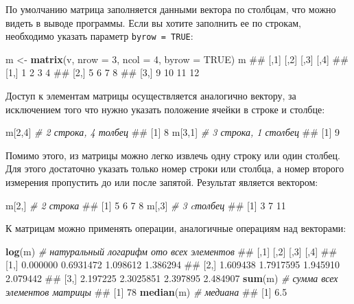 \documentclass[]{book}
\newenvironment{Shaded}{\begin{snugshade}}{\end{snugshade}}
\newcommand{\KeywordTok}[1]{\textcolor[rgb]{0.13,0.29,0.53}{\textbf{#1}}}
\newcommand{\DataTypeTok}[1]{\textcolor[rgb]{0.13,0.29,0.53}{#1}}
\newcommand{\DecValTok}[1]{\textcolor[rgb]{0.00,0.00,0.81}{#1}}
\newcommand{\StringTok}[1]{\textcolor[rgb]{0.31,0.60,0.02}{#1}}
\newcommand{\CommentTok}[1]{\textcolor[rgb]{0.56,0.35,0.01}{\textit{#1}}}
\newcommand{\OtherTok}[1]{\textcolor[rgb]{0.56,0.35,0.01}{#1}}
\newcommand{\NormalTok}[1]{#1}
\begin{document}
По умолчанию матрица заполняется данными вектора по столбцам, что можно
видеть в выводе программы. Если вы хотите заполнить ее по строкам,
необходимо указать параметр \texttt{byrow\ =\ TRUE}:

\begin{Shaded}
\begin{Highlighting}[]
\NormalTok{m <-}\StringTok{ }\KeywordTok{matrix}\NormalTok{(v, }\DataTypeTok{nrow =} \DecValTok{3}\NormalTok{, }\DataTypeTok{ncol =} \DecValTok{4}\NormalTok{, }\DataTypeTok{byrow =} \OtherTok{TRUE}\NormalTok{)}
\NormalTok{m}
\NormalTok{##      [,1] [,2] [,3] [,4]}
\NormalTok{## [1,]    1    2    3    4}
\NormalTok{## [2,]    5    6    7    8}
\NormalTok{## [3,]    9   10   11   12}
\end{Highlighting}
\end{Shaded}

Доступ к элементам матрицы осуществляется аналогично вектору, за
исключением того что нужно указать положение ячейки в строке и столбце:

\begin{Shaded}
\begin{Highlighting}[]
\NormalTok{m[}\DecValTok{2}\NormalTok{,}\DecValTok{4}\NormalTok{]  }\CommentTok{# 2 строка, 4 толбец}
\NormalTok{## [1] 8}
\NormalTok{m[}\DecValTok{3}\NormalTok{,}\DecValTok{1}\NormalTok{]  }\CommentTok{# 3 строка, 1 столбец}
\NormalTok{## [1] 9}
\end{Highlighting}
\end{Shaded}

Помимо этого, из матрицы можно легко извлечь одну строку или один
столбец. Для этого достаточно указать только номер строки или столбца, а
номер второго измерения пропустить до или после запятой. Результат
является вектором:

\begin{Shaded}
\begin{Highlighting}[]
\NormalTok{m[}\DecValTok{2}\NormalTok{,]  }\CommentTok{# 2 строка}
\NormalTok{## [1] 5 6 7 8}
\NormalTok{m[,}\DecValTok{3}\NormalTok{]  }\CommentTok{# 3 cтолбец}
\NormalTok{## [1]  3  7 11}
\end{Highlighting}
\end{Shaded}

К матрицам можно применять операции, аналогичные операциям над
векторами:

\begin{Shaded}
\begin{Highlighting}[]
\KeywordTok{log}\NormalTok{(m)  }\CommentTok{# натуральный логарифм ото всех элементов}
\NormalTok{##          [,1]      [,2]     [,3]     [,4]}
\NormalTok{## [1,] 0.000000 0.6931472 1.098612 1.386294}
\NormalTok{## [2,] 1.609438 1.7917595 1.945910 2.079442}
\NormalTok{## [3,] 2.197225 2.3025851 2.397895 2.484907}
\KeywordTok{sum}\NormalTok{(m)  }\CommentTok{# сумма всех элементов матрицы}
\NormalTok{## [1] 78}
\KeywordTok{median}\NormalTok{(m) }\CommentTok{# медиана}
\NormalTok{## [1] 6.5}
\end{Highlighting}
\end{Shaded}
\end{document}
